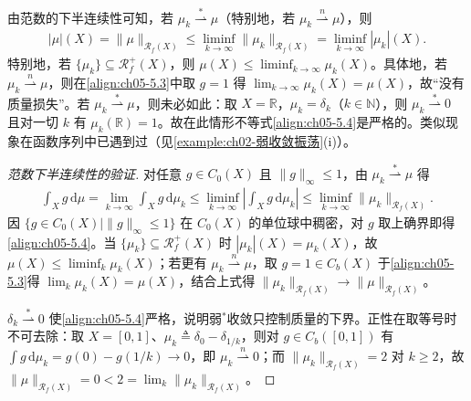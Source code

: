 \documentclass[../../main.tex]{subfiles}%
\begin{document}
\begin{remark}\label{remark:ch05-范数下半连续}
\label{remark:ch05-5.1.3}
由范数的下半连续性可知，若 $\mu_k\stackrel{*}{\rightharpoonup}\mu$（特别地，若 $\mu_k\stackrel{n}{\rightharpoonup}\mu$），则
\begin{align}
|\mu|(X)=\|\mu\|_{\mathscr{R}_f(X)}
\leqslant\liminf_{k\to\infty}\|\mu_k\|_{\mathscr{R}_f(X)}
=\liminf_{k\to\infty}|\mu_k|(X).\label{align:ch05-5.4}
\end{align}
特别地，若 $\{\mu_k\}\subseteq\mathscr{R}^+_f(X)$，则 $\mu(X)\leqslant\liminf_{k\to\infty}\mu_k(X)$。具体地，若 $\mu_k\stackrel{n}{\rightharpoonup}\mu$，则在\eqref{align:ch05-5.3}中取 $g=1$ 得 $\lim_{k\to\infty}\mu_k(X)=\mu(X)$，故“没有质量损失”。若 $\mu_k\stackrel{*}{\rightharpoonup}\mu$，则未必如此：取 $X=\mathbb{R}$，$\mu_k=\delta_k$（$k\in\mathbb{N}$），则 $\mu_k\stackrel{*}{\rightharpoonup}0$ 且对一切 $k$ 有 $\mu_k(\mathbb{R})=1$。故在此情形不等式\eqref{align:ch05-5.4}是严格的。类似现象在函数序列中已遇到过（见\cref{example:ch02-弱收敛振荡}(i)）。
\end{remark}

\begin{proof}[范数下半连续性的验证]
对任意 $g\in C_0(X)$ 且 $\|g\|_\infty\leqslant1$，由 $\mu_k\stackrel{*}{\rightharpoonup}\mu$ 得
\begin{align*}
\int_X g\,\mathrm{d}\mu=\lim_{k\to\infty}\int_X g\,\mathrm{d}\mu_k
\leqslant\liminf_{k\to\infty}\left|\int_X g\,\mathrm{d}\mu_k\right|
\leqslant\liminf_{k\to\infty}\|\mu_k\|_{\mathscr{R}_f(X)} .
\end{align*}
因 $\{g\in C_0(X)\mid\|g\|_\infty\leqslant1\}$ 在 $C_0(X)$ 的单位球中稠密，对 $g$ 取上确界即得\eqref{align:ch05-5.4}。当 $\{\mu_k\}\subseteq\mathscr{R}^+_f(X)$ 时 $|\mu_k|(X)=\mu_k(X)$，故 $\mu(X)\leqslant\liminf_k\mu_k(X)$；若更有 $\mu_k\stackrel{n}{\rightharpoonup}\mu$，取 $g=1\in C_b(X)$ 于\eqref{align:ch05-5.3}得 $\lim_k\mu_k(X)=\mu(X)$，结合上式得 $\|\mu_k\|_{\mathscr{R}_f(X)}\to\|\mu\|_{\mathscr{R}_f(X)}$。

$\delta_k\stackrel{*}{\rightharpoonup}0$ 使\eqref{align:ch05-5.4}严格，说明弱$^*$收敛只控制质量的下界。正性在取等号时不可去除：取 $X=[0,1]$、$\mu_k\triangleq\delta_0-\delta_{1/k}$，则对 $g\in C_b([0,1])$ 有 $\int g\,\mathrm{d}\mu_k=g(0)-g(1/k)\to0$，即 $\mu_k\stackrel{n}{\rightharpoonup}0$；而 $\|\mu_k\|_{\mathscr{R}_f(X)}=2$ 对 $k\geqslant2$，故 $\|\mu\|_{\mathscr{R}_f(X)}=0<2=\lim_k\|\mu_k\|_{\mathscr{R}_f(X)}$。
\end{proof}
\end{document}
